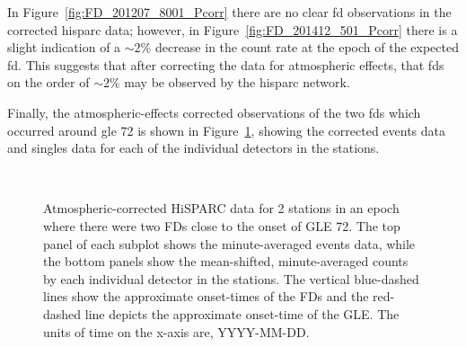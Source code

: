 In Figure~\ref{fig:FD_201207_8001_Pcorr} there are no clear \gls{fd} observations in the corrected \gls{hisparc} data; however, in Figure~\ref{fig:FD_201412_501_Pcorr} there is a slight indication of a $\sim2\%$ decrease in the count rate at the epoch of the expected \gls{fd}. This suggests that after correcting the data for atmospheric effects, that \glspl{fd} on the order of $\sim 2\%$ may be observed by the \gls{hisparc} network.

Finally, the atmospheric-effects corrected observations of the two \glspl{fd} which occurred around \gls{gle} 72 is shown in Figure~\ref{fig:FD_GLE72_Pcorr}, showing the corrected events data and singles data for each of the individual detectors in the stations.

\begin{figure}[ht!]
	\centering
	 \\
	
	
	\caption{Atmospheric-corrected HiSPARC data for 2 stations in an epoch where there were two FDs close to the onset of GLE 72. The top panel of each subplot shows the minute-averaged events data, while the bottom panels show the mean-shifted, minute-averaged counts by each individual detector in the stations. The vertical blue-dashed lines show the approximate onset-times of the FDs and the red-dashed line depicts the approximate onset-time of the GLE. The units of time on the x-axis are, YYYY-MM-DD.}
	\label{fig:FD_GLE72_Pcorr}
\end{figure}

